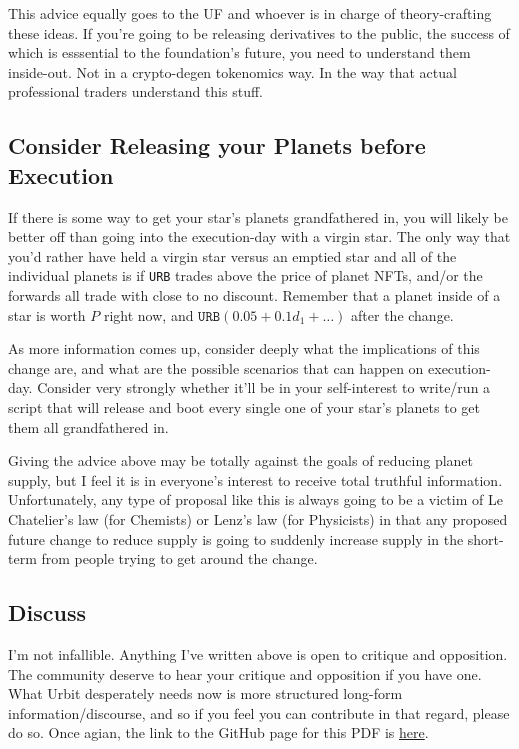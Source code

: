 \documentclass{article}
\begin{document}
	This advice equally goes to the UF and whoever is in charge of theory-crafting these ideas. If you're going to be releasing derivatives to the public, the success of which is esssential to the foundation's future, you need to understand them inside-out. Not in a crypto-degen tokenomics way. In the way that actual professional traders understand this stuff.
	
	\subsection{Consider Releasing your Planets before Execution}
	If there is some way to get your star's planets grandfathered in, you will likely be better off than going into the execution-day with a virgin star. The only way that you'd rather have held a virgin star versus an emptied star and all of the individual planets is if \texttt{URB} trades above the price of planet NFTs, and/or the forwards all trade with close to no discount. Remember that a planet inside of a star is worth $P$ right now, and $\texttt{URB}(0.05 + 0.1d_1 + \ldots)$ after the change. 
	
	As more information comes up, consider deeply what the implications of this change are, and what are the possible scenarios that can happen on execution-day. Consider very strongly whether it'll be in your self-interest to write/run a script that will release and boot every single one of your star's planets to get them all grandfathered in. 
	
	Giving the advice above may be totally against the goals of reducing planet supply, but I feel it is in everyone's interest to receive total truthful information. Unfortunately, any type of proposal like this is always going to be a victim of Le Chatelier's law (for Chemists) or Lenz's law (for Physicists) in that any proposed future change to reduce supply is going to suddenly increase supply in the short-term from people trying to get around the change.
	
	\subsection{Discuss}
	I'm not infallible. Anything I've written above is open to critique and opposition. The community deserve to hear your critique and opposition if you have one. What Urbit desperately needs now is more structured long-form information/discourse, and so if you feel you can contribute in that regard, please do so. Once agian, the link to the GitHub page for this PDF is \href{https://github.com/IzaacMammadov/forwards-for-urbiters}{here}.
	\printbibliography
\end{document}
